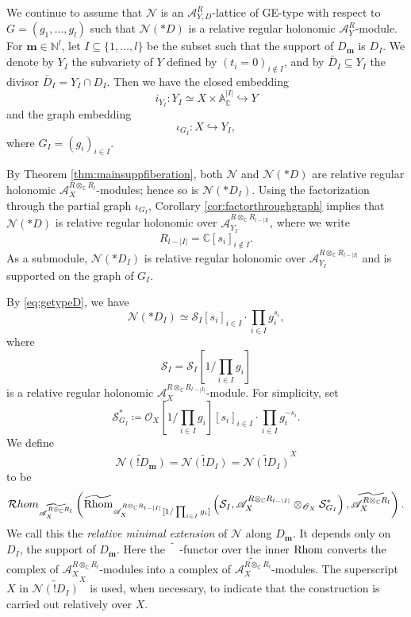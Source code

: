 \documentclass{amsart}
\theoremstyle{plain}
\numberwithin{theorem}{section}
\theoremstyle{definition}
\theoremstyle{remark}
\theoremstyle{definition}
\newcommand{\wt}{\widetilde}
\newcommand{\A}{\mathbb{A}}
\newcommand{\C}{\mathbb{C}} %
\newcommand{\N}{\mathbb{N}}
\newcommand{\cN}{\mathcal{N}}
\newcommand{\cO}{\mathscr{O}}
\newcommand{\cS}{\mathcal{S}}
\newcommand{\bm}{\mathbf{m}}
\newcommand{\sA}{\mathscr{A}}
\newcommand{\Rhom}{\textup{Rhom}}
\newcommand{\cRhom}{\mathcal Rhom}
\begin{document}
We continue to assume that $\cN$ is an $\sA^R_{Y,D}$-lattice of GE-type with
respect to
$G=(g_1,\dots,g_l)$
such that $\cN(*D)$ is a relative regular holonomic $\sA^R_Y$-module. For
$\bm\in\N^l$, let $I\subseteq \{1,\dots,l\}$ be the subset such that the support
of $D_\bm$ is $D_I$. We denote by $Y_I$ the subvariety of $Y$ defined by
$(t_i=0)_{i\notin I}$,
and by $\bar D_I\subseteq Y_I$ the divisor
$\bar D_I=Y_I\cap D_I$.
Then we have the closed embedding
\[
i_{Y_I}\colon Y_I\simeq X\times \A_\C^{|I|}\hookrightarrow Y
\]
and the graph embedding
\[
\iota_{G_I}\colon X\hookrightarrow Y_I,
\]
where
$G_I=(g_i)_{i\in I}.$

By Theorem \ref{thm:mainsuppfiberation}, both $\cN$ and $\cN(*D)$ are relative
regular holonomic $\sA_X^{R\otimes_\C R_l}$-modules; hence so is
$\cN(*D_I)$. Using the factorization through the partial graph
$\iota_{G_I}$, Corollary \ref{cor:factorthroughgraph} implies that
$\cN(*D)$ is relative regular holonomic over
$\sA_{Y_I}^{R\otimes_\C R_{l-|I|}}$,
where we write
\[
R_{l-|I|}=\C[s_i]_{i\notin I}.
\]
As a submodule, $\cN(*D_I)$ is relative regular holonomic over
$\sA_{Y_I}^{R\otimes_\C R_{l-|I|}}$ and is supported on the graph of $G_I$.

By \eqref{eq:getypeD}, we have
\begin{equation}\label{eq:partiallocKE}
\cN(*D_I)
\simeq
\cS_I[s_i]_{i\in I}\cdot \prod_{i\in I}g_i^{s_i},
\end{equation}
where
\[
\cS_I=\cS_I\left[1/\prod_{i\in I}g_i\right]
\]
is a relative regular holonomic
$\sA_X^{R\otimes_\C R_{l-|I|}}$-module. For simplicity, set
\[
\cS_{G_I}^*
\coloneqq
\cO_X\left[1/\prod_{i\in I}g_i\right][s_i]_{i\in I}
\cdot
\prod_{i\in I}g_i^{-s_i}.
\]
We define
\[
\wt{\cN(!D_\bm)}
=
\wt{\cN(!D_I)}
=
\wt{\cN(!D_I)}^X
\]
to be
\[
\cRhom_{\widetilde{\sA_X^{R\otimes_\C R_l}}}
\left(
\widetilde{\Rhom}_{\sA_X^{R\otimes_\C R_{l-|I|}}
[1/\prod_{i\in I}g_i]}
\left(
\cS_I,
\sA_X^{R\otimes_\C R_{l-|I|}}\otimes_{\cO_X}\cS_{G_I}^*
\right),
\widetilde{\sA_X^{R\otimes_\C R_l}}
\right).
\]
We call this the \emph{relative minimal extension} of $\cN$ along $D_\bm$.
It depends only on $D_I$, the support of $D_\bm$. Here the
$\widetilde{\phantom{M}}$-functor over the inner $\Rhom$ converts the complex
of $\sA_X^{R\otimes_\C R_l}$-modules into a complex of
$\widetilde{\sA_X^{R\otimes_\C R_l}}$-modules. The superscript $X$ in
$\wt{\cN(!D_I)}^X$ is used, when necessary, to indicate that the construction
is carried out relatively over $X$.
\end{document}
